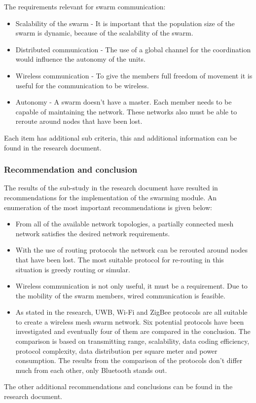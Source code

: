 \documentclass[10pt,a4paper]{article}
\begin{document}
The requirements relevant for swarm communication:
\begin{itemize}
\setlength\itemsep{0em}
    \item Scalability of the swarm - It is important that the population size of the swarm is
    dynamic, because of the scalability of the swarm.
    \item Distributed communication - The use of a global channel for the coordination would influence the autonomy of the units.\cite{swarmintelligence}
    \item Wireless communication - To give the members full freedom of movement it is useful for the   communication to be wireless.
    \item Autonomy - A swarm doesn't have a master. Each member needs to be capable of maintaining the  network. These networks also must be able to reroute around nodes that have
    been lost.
\end{itemize}
Each item has additional sub criteria, this and additional information can be found in the research document.


\subsubsection{Recommendation and conclusion}
The results of the sub-study in the research document have resulted in recommendations for the implementation of the
swarming module. An enumeration of the most important recommendations is given below:
\begin{itemize}
\setlength\itemsep{0em}
    \item From all of the available network topologies, a partially connected mesh network satisfies the desired network requirements.
    \item With the use of routing protocols the network can be rerouted around nodes that have been lost. The most suitable protocol for re-routing in this situation is greedy routing or simular.
    \item Wireless communication is not only useful, it must be a requirement. Due to the mobility of the swarm members, wired communication is feasible.
    \item As stated in the research, UWB, Wi-Fi and ZigBee protocols are all suitable to create a wireless mesh swarm network. Six potential protocols have been investigated and eventually four of them are compared in the conclusion. The comparison is based on transmitting range, scalability, data coding efficiency, protocol complexity, data distribution per square meter and power consumption. The results from the comparison of the protocols don't differ much from each other, only Bluetooth stands out.
\end{itemize}
The other additional recommendations and conclusions can be found in the research document.
\end{document}
